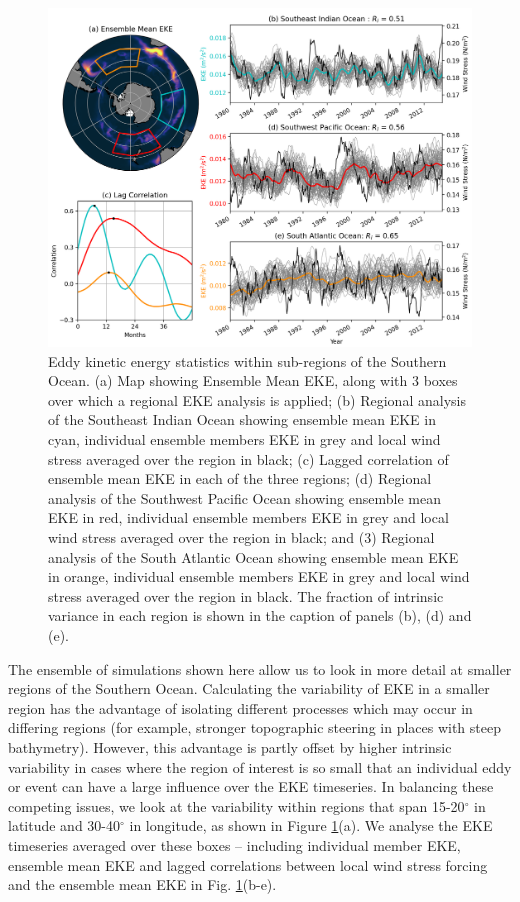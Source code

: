 \documentclass{agujournal2019-navid}
\begin{document}
\begin{figure}[t]
\begin{center}
\includegraphics[width=\hsize]{Figure3}
\caption{Eddy kinetic energy statistics within sub-regions of the Southern Ocean. (a) Map showing Ensemble Mean EKE, along with 3 boxes over which a regional EKE analysis is applied; (b) Regional analysis of the Southeast Indian Ocean showing ensemble mean EKE in cyan, individual ensemble members EKE in grey and local wind stress averaged over the region in black; (c) Lagged correlation of ensemble mean EKE in each of the three regions; (d) Regional analysis of the Southwest Pacific Ocean showing ensemble mean EKE in red, individual ensemble members EKE in grey and local wind stress averaged over the region in black; and (3) Regional analysis of the South Atlantic Ocean showing ensemble mean EKE in orange, individual ensemble members EKE in grey and local wind stress averaged over the region in black. The fraction of intrinsic variance in each region is shown in the caption of panels (b), (d) and (e).}
\label{Fig:3}
\end{center}
\end{figure}

The ensemble of simulations shown here allow us to look in more detail at smaller regions of the Southern Ocean.
Calculating the variability of EKE in a smaller region has the advantage of isolating different processes which may occur in differing regions (for example, stronger topographic steering in places with steep bathymetry).
However, this advantage is partly offset by higher intrinsic variability in cases where the region of interest is so small that an individual eddy or event can have a large influence over the EKE timeseries.
In balancing these competing issues, we look at the variability within regions that span 15-20$^\circ$ in latitude and 30-40$^\circ$ in longitude, as shown in Figure \ref{Fig:3}(a).
We analyse the EKE timeseries averaged over these boxes -- including individual member EKE, ensemble mean EKE and lagged correlations between local wind stress forcing and the ensemble mean EKE in Fig. \ref{Fig:3}(b-e).
\end{document}
